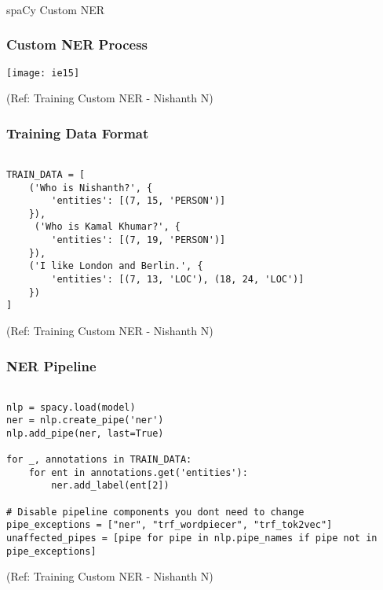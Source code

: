 \begin{frame}[fragile]\frametitle{}

\begin{center}
{\Large spaCy Custom NER}
\end{center}
\end{frame}

\begin{frame}[fragile]\frametitle{Custom NER Process}


\begin{center}
\texttt{[image: ie15]}
\end{center}

{\tiny (Ref: Training Custom NER - Nishanth N)}

\end{frame}

\begin{frame}[fragile]\frametitle{Training Data Format}


\begin{lstlisting}

TRAIN_DATA = [
    ('Who is Nishanth?', {
        'entities': [(7, 15, 'PERSON')]
    }),
     ('Who is Kamal Khumar?', {
        'entities': [(7, 19, 'PERSON')]
    }),
    ('I like London and Berlin.', {
        'entities': [(7, 13, 'LOC'), (18, 24, 'LOC')]
    })
]
\end{lstlisting}

{\tiny (Ref: Training Custom NER - Nishanth N)}

\end{frame}

\begin{frame}[fragile]\frametitle{NER Pipeline}


\begin{lstlisting}

nlp = spacy.load(model)  
ner = nlp.create_pipe('ner')
nlp.add_pipe(ner, last=True)

for _, annotations in TRAIN_DATA:
    for ent in annotations.get('entities'):
        ner.add_label(ent[2])
				
# Disable pipeline components you dont need to change
pipe_exceptions = ["ner", "trf_wordpiecer", "trf_tok2vec"]
unaffected_pipes = [pipe for pipe in nlp.pipe_names if pipe not in pipe_exceptions]

\end{lstlisting}

{\tiny (Ref: Training Custom NER - Nishanth N)}

\end{frame}

